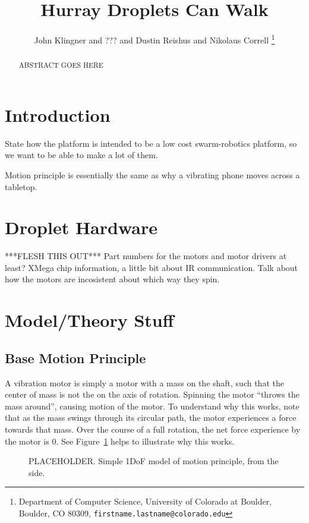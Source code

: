 \documentclass[letterpaper, 10pt, conference]{ieeeconf}
\title{\LARGE \bf
Hurray Droplets Can Walk
}
\author{ John Klingner and ??? and Dustin Reishus and Nikolaus Correll%
\thanks{Department of Computer Science,
University of Colorado at Boulder,
 Boulder, CO 80309,
{\tt\small firstname.lastname{@}colorado.edu}}%
}
\begin{document}
\maketitle

\begin{abstract}
ABSTRACT GOES HERE
\end{abstract}

\section{Introduction}
State how the platform is intended to be a low cost swarm-robotics platform, so we want to be able to make a lot of them.

Motion principle is essentially the same as why a vibrating phone moves across a tabletop.

\section{Droplet Hardware}
***FLESH THIS OUT***
Part numbers for the motors and motor drivers at least? XMega chip information, a little bit about IR communication. Talk about how the motors are incosistent about which way they spin.

\section{Model/Theory Stuff}

\subsection{Base Motion Principle}
A vibration motor is simply a motor with a mass on the shaft, such that the center of mass is not the on the axis of rotation. Spinning the motor ``throws the mass around'', causing motion of the motor. To understand why this works, note that as the mass swings through its circular path, the motor experiences a force towards that mass. Over the course of a full rotation, the net force experience by the motor is 0. See Figure~\ref{motorDiagram} helps to illustrate why this works.

\begin{figure}
\centering
\caption{PLACEHOLDER. Simple 1DoF model of motion principle, from the side.}
\label{motorDiagram}
\end{figure}
\end{document}
